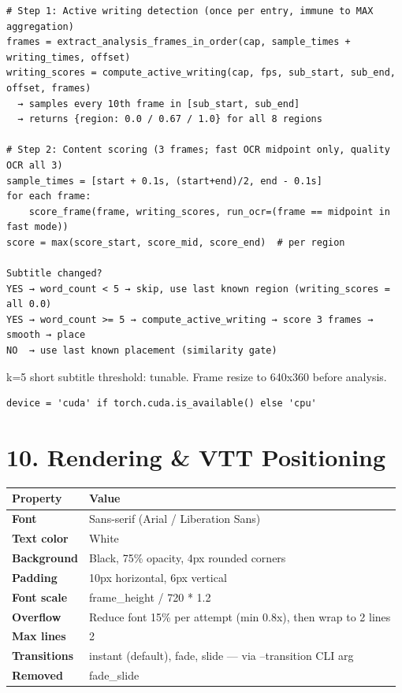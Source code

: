 \documentclass[11pt]{article}
\begin{document}
\begin{verbatim}
# Step 1: Active writing detection (once per entry, immune to MAX aggregation)
frames = extract_analysis_frames_in_order(cap, sample_times + writing_times, offset)
writing_scores = compute_active_writing(cap, fps, sub_start, sub_end, offset, frames)
  → samples every 10th frame in [sub_start, sub_end]
  → returns {region: 0.0 / 0.67 / 1.0} for all 8 regions

# Step 2: Content scoring (3 frames; fast OCR midpoint only, quality OCR all 3)
sample_times = [start + 0.1s, (start+end)/2, end - 0.1s]
for each frame:
    score_frame(frame, writing_scores, run_ocr=(frame == midpoint in fast mode))
score = max(score_start, score_mid, score_end)  # per region

Subtitle changed?
YES → word_count < 5 → skip, use last known region (writing_scores = all 0.0)
YES → word_count >= 5 → compute_active_writing → score 3 frames → smooth → place
NO  → use last known placement (similarity gate)
\end{verbatim}

k=5 short subtitle threshold: tunable. Frame resize to 640x360 before analysis.

\begin{verbatim}
device = 'cuda' if torch.cuda.is_available() else 'cpu'
\end{verbatim}

\section*{10. Rendering \& VTT Positioning}
\begin{tabularx}{\textwidth}{>{\bfseries}l X}
Property & Value \\
\midrule
Font & Sans-serif (Arial / Liberation Sans) \\
Text color & White \\
Background & Black, 75\% opacity, 4px rounded corners \\
Padding & 10px horizontal, 6px vertical \\
Font scale & frame\_height / 720 * 1.2 \\
Overflow & Reduce font 15\% per attempt (min 0.8x), then wrap to 2 lines \\
Max lines & 2 \\
Transitions & instant (default), fade, slide --- via --transition CLI arg \\
Removed & fade\_slide \\
\end{tabularx}
\end{document}
